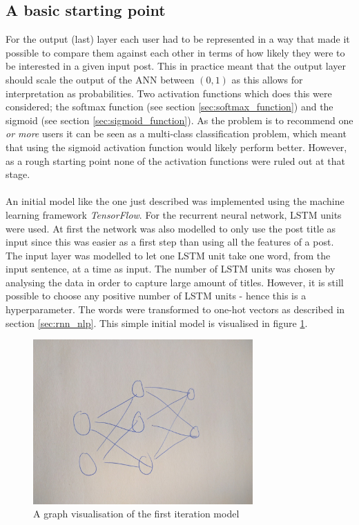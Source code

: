 \subsection{A basic starting point}
For the output (last) layer each user had to be represented in a way that made it possible to compare them against each other in terms of how likely they were to be interested in a given input post. This in practice meant that the output layer should scale the output of the ANN between $(0,1)$ as this allows for interpretation as probabilities. Two activation functions which does this were considered; the softmax function (see section \ref{sec:softmax_function}) and the sigmoid (see section \ref{sec:sigmoid_function}). As the problem is to recommend one \textit{or more} users it can be seen as a multi-class classification problem, which meant that using the sigmoid activation function would likely perform better. However, as a rough starting point none of the activation functions were ruled out at that stage.
\\\\
An initial model like the one just described was implemented using the machine learning framework \textit{TensorFlow}. For the recurrent neural network, LSTM units were used. At first the network was also modelled to only use the post title as input since this was easier as a first step than using all the features of a post. The input layer was modelled to let one LSTM unit take one word, from the input sentence, at a time as input. The number of LSTM units was chosen by analysing the data in order to capture large amount of titles. However, it is still possible to choose any positive number of LSTM units - hence this is a hyperparameter. The words were transformed to one-hot vectors as described in section \ref{sec:rnn_nlp}. This simple initial model is visualised in figure \ref{fig:first_simple_model}.
\begin{figure}[h]
    \centering
    \includegraphics[width=0.75\textwidth]{figure/ann/ann}
    \caption{A graph visualisation of the first iteration model}
    \label{fig:first_simple_model}
\end{figure}
